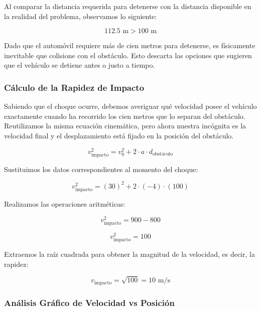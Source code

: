 \documentclass[12pt, a4paper]{article}
\begin{document}
Al comparar la distancia requerida para detenerse con la distancia disponible en la realidad del problema, observamos lo siguiente:

\begin{equation}
112.5 \text{ m} > 100 \text{ m}
\end{equation}

Dado que el automóvil requiere más de cien metros para detenerse, es físicamente inevitable que colisione con el obstáculo. Esto descarta las opciones que sugieren que el vehículo se detiene antes o justo a tiempo.

\subsubsection*{Cálculo de la Rapidez de Impacto}

Sabiendo que el choque ocurre, debemos averiguar qué velocidad posee el vehículo exactamente cuando ha recorrido los cien metros que lo separan del obstáculo. Reutilizamos la misma ecuación cinemática, pero ahora nuestra incógnita es la velocidad final y el desplazamiento está fijado en la posición del obstáculo.

\begin{equation}
v_{\text{impacto}}^2 = v_0^2 + 2 \cdot a \cdot d_{\text{obstáculo}}
\end{equation}

Sustituimos los datos correspondientes al momento del choque:

\begin{equation}
v_{\text{impacto}}^2 = (30)^2 + 2 \cdot (-4) \cdot (100)
\end{equation}

Realizamos las operaciones aritméticas:

\begin{equation}
v_{\text{impacto}}^2 = 900 - 800
\end{equation}

\begin{equation}
v_{\text{impacto}}^2 = 100
\end{equation}

Extraemos la raíz cuadrada para obtener la magnitud de la velocidad, es decir, la rapidez:

\begin{equation}
v_{\text{impacto}} = \sqrt{100} = 10 \text{ m/s}
\end{equation}

\subsubsection*{Análisis Gráfico de Velocidad vs Posición}
\end{document}
